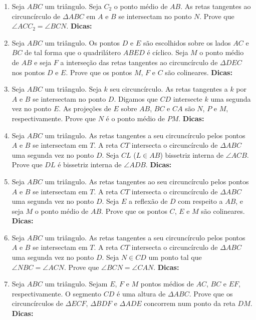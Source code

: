 \documentclass{article}
\newcommand{\dica}{\textbf{Dicas:}}
\newcommand{\iniTri}{Seja $ABC$ um triângulo}
\begin{document}
\begin{multicols}{2}
\begin{enumerate}
    \item \iniTri. Seja $C_2$ o ponto médio de $AB$. As retas tangentes ao circuncírculo de $\Delta ABC$ em $A$ e $B$ se intersectam no ponto $N$. Prove que $\angle ACC_2=\angle BCN$. \dica %
    
    \item \iniTri. Os pontos $D$ e $E$ são escolhidos sobre os lados $AC$ e $BC$ de tal forma que o quadrilátero $ABED$ é cíclico. Seja $M$ o ponto médio de $AB$ e seja $F$ a interseção das retas tangentes ao circuncírculo de $\Delta DEC$ nos pontos $D$ e $E$. Prove que os pontos $M$, $F$ e $C$ são colineares. \dica %
    
    \item \iniTri. Seja $k$ seu circuncírculo. As retas tangentes a $k$ por $A$ e $B$ se intersectam no ponto $D$. Digamos que $CD$ intersecte $k$ uma segunda vez no ponto $E$. As projeções de $E$ sobre $AB$, $BC$ e $CA$ são $N$, $P$ e $M$, respectivamente. Prove que $N$ é o ponto médio de $PM$. \dica %
    
    \item \iniTri. As retas tangentes a seu circuncírculo pelos pontos $A$ e $B$ se intersectam em $T$. A reta $CT$ intersecta o circuncírculo de $\Delta ABC$ uma segunda vez no ponto $D$. Seja $CL$ ($L\in AB$) bissetriz interna de $\angle ACB$. Prove que $DL$ é bissetriz interna de $\angle ADB$. \dica %
    
    \item \iniTri. As retas tangentes ao seu circuncírculo pelos pontos $A$ e $B$ se intersectam em $T$. A reta $CT$ intersecta o circuncírculo de $\Delta ABC$ uma segunda vez no ponto $D$. Seja $E$ a reflexão de $D$ com respeito a $AB$, e seja $M$ o ponto médio de $AB$. Prove que os pontos $C$, $E$ e $M$ são colineares. \dica %
    
    \item \iniTri. As retas tangentes a seu circuncírculo pelos pontos $A$ e $B$ se intersectam em $T$. A reta $CT$ intersecta o circuncírculo de $\Delta ABC$ uma segunda vez no ponto $D$. Seja $N\in CD$ um ponto tal que $\angle NBC=\angle ACN$. Prove que $\angle BCN=\angle CAN$. \dica %
    
    \item \iniTri. Sejam $E$, $F$ e $M$ pontos médios de $AC$, $BC$ e $EF$, respectivamente. O segmento $CD$ é uma altura de $\Delta ABC$. Prove que os circuncírculos de $\Delta ECF$, $\Delta BDF$ e $\Delta ADE$ concorrem num ponto da reta $DM$. \dica %
    

\end{enumerate}
\end{multicols}
\end{document}
